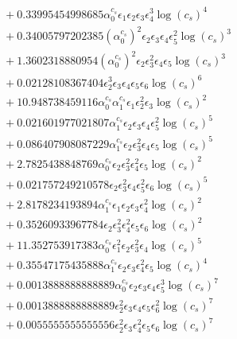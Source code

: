 \documentclass[10pt]{article}
\begin{document}
\begin{align*}
&{}  + 0.33995454998685 \alpha_{0}^{c_s} \epsilon_{1} \epsilon_{2} \epsilon_{3} \epsilon_{4}^{3} \log{\left(c_{s} \right)}^{4} \\
&{}  + 0.34005797202385 \left(\alpha_{0}^{c_s}\right)^{2} \epsilon_{2} \epsilon_{3} \epsilon_{4} \epsilon_{5}^{2} \log{\left(c_{s} \right)}^{3} \\
&{}  + 1.3602318880954 \left(\alpha_{0}^{c_s}\right)^{2} \epsilon_{2} \epsilon_{3}^{2} \epsilon_{4} \epsilon_{5} \log{\left(c_{s} \right)}^{3} \\
&{}  + 0.02128108367404 \epsilon_{2}^{3} \epsilon_{3} \epsilon_{4} \epsilon_{5} \epsilon_{6} \log{\left(c_{s} \right)}^{6} \\
&{}  + 10.948738459116 \alpha_{0}^{c_s} \alpha_{1}^{c_s} \epsilon_{1} \epsilon_{2}^{2} \epsilon_{3} \log{\left(c_{s} \right)}^{2} \\
&{}  + 0.021601977021807 \alpha_{1}^{c_s} \epsilon_{2} \epsilon_{3} \epsilon_{4} \epsilon_{5}^{2} \log{\left(c_{s} \right)}^{5} \\
&{}  + 0.086407908087229 \alpha_{1}^{c_s} \epsilon_{2} \epsilon_{3}^{2} \epsilon_{4} \epsilon_{5} \log{\left(c_{s} \right)}^{5} \\
&{}  + 2.7825438848769 \alpha_{0}^{c_s} \epsilon_{2} \epsilon_{3}^{2} \epsilon_{4}^{2} \epsilon_{5} \log{\left(c_{s} \right)}^{2} \\
&{}  + 0.021757249210578 \epsilon_{2} \epsilon_{3}^{2} \epsilon_{4} \epsilon_{5}^{2} \epsilon_{6} \log{\left(c_{s} \right)}^{5} \\
&{}  + 2.8178234193894 \alpha_{1}^{c_s} \epsilon_{1} \epsilon_{2} \epsilon_{3} \epsilon_{4}^{2} \log{\left(c_{s} \right)}^{2} \\
&{}  + 0.35260933967784 \epsilon_{2} \epsilon_{3}^{2} \epsilon_{4}^{2} \epsilon_{5} \epsilon_{6} \log{\left(c_{s} \right)}^{2} \\
&{}  + 11.352753917383 \alpha_{0}^{c_s} \epsilon_{1}^{2} \epsilon_{2} \epsilon_{3}^{2} \epsilon_{4} \log{\left(c_{s} \right)}^{5} \\
&{}  + 0.35547175435888 \alpha_{1}^{c_s} \epsilon_{2} \epsilon_{3} \epsilon_{4}^{2} \epsilon_{5} \log{\left(c_{s} \right)}^{4} \\
&{}  + 0.0013888888888889 \alpha_{0}^{c_s} \epsilon_{2} \epsilon_{3} \epsilon_{4} \epsilon_{5}^{3} \log{\left(c_{s} \right)}^{7} \\
&{}  + 0.0013888888888889 \epsilon_{2}^{2} \epsilon_{3} \epsilon_{4} \epsilon_{5} \epsilon_{6}^{2} \log{\left(c_{s} \right)}^{7} \\
&{}  + 0.0055555555555556 \epsilon_{2}^{2} \epsilon_{3} \epsilon_{4}^{2} \epsilon_{5} \epsilon_{6} \log{\left(c_{s} \right)}^{7} \\

\end{align*}
\end{document}

